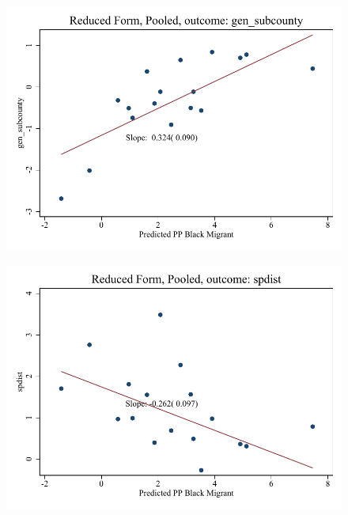 \documentclass{article}
\begin{document}
\clearpage
\begin{figure}
	\centering
	\includegraphics[width=.8\textwidth]{figures/binscatter/pooled_gen_subcounty_rf.pdf}
\end{figure}
\clearpage
\begin{figure}
	\centering
	\includegraphics[width=.8\textwidth]{figures/binscatter/pooled_spdist_rf.pdf}
\end{figure}
\clearpage
\end{document}
